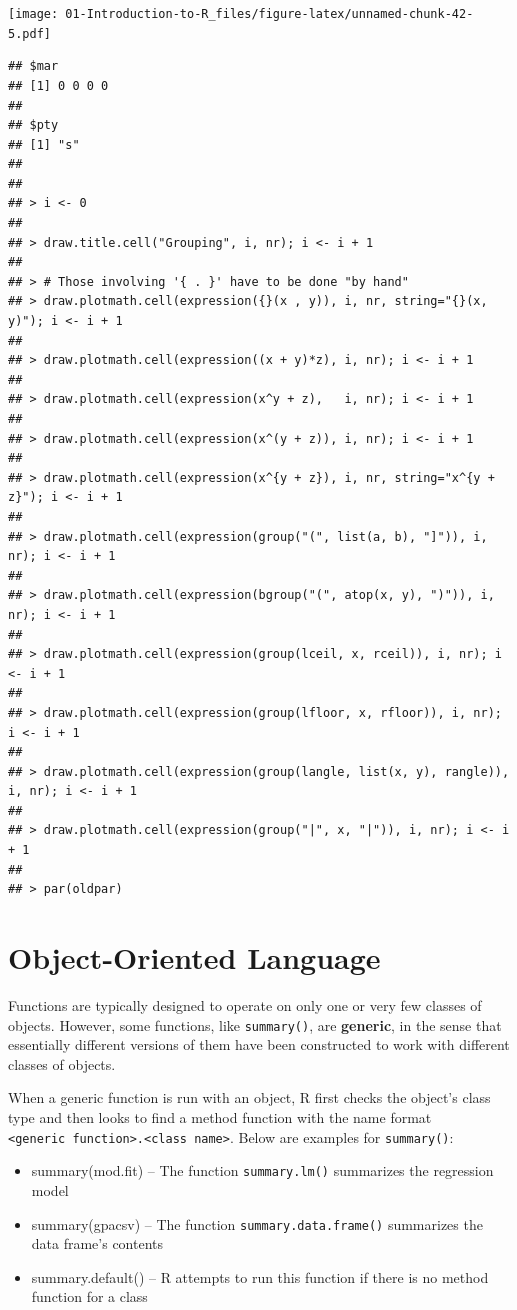 \documentclass[
]{book}
\providecommand{\tightlist}{%
  \setlength{\itemsep}{0pt}\setlength{\parskip}{0pt}}
\theoremstyle{definition}
\theoremstyle{definition}
\theoremstyle{definition}
\theoremstyle{definition}
\theoremstyle{remark}
\begin{document}
\texttt{[image: 01-Introduction-to-R\_files/figure-latex/unnamed-chunk-42-5.pdf]}

\begin{verbatim}
## $mar
## [1] 0 0 0 0
## 
## $pty
## [1] "s"
## 
## 
## > i <- 0
## 
## > draw.title.cell("Grouping", i, nr); i <- i + 1
## 
## > # Those involving '{ . }' have to be done "by hand"
## > draw.plotmath.cell(expression({}(x , y)), i, nr, string="{}(x, y)"); i <- i + 1
## 
## > draw.plotmath.cell(expression((x + y)*z), i, nr); i <- i + 1
## 
## > draw.plotmath.cell(expression(x^y + z),   i, nr); i <- i + 1
## 
## > draw.plotmath.cell(expression(x^(y + z)), i, nr); i <- i + 1
## 
## > draw.plotmath.cell(expression(x^{y + z}), i, nr, string="x^{y + z}"); i <- i + 1
## 
## > draw.plotmath.cell(expression(group("(", list(a, b), "]")), i, nr); i <- i + 1
## 
## > draw.plotmath.cell(expression(bgroup("(", atop(x, y), ")")), i, nr); i <- i + 1
## 
## > draw.plotmath.cell(expression(group(lceil, x, rceil)), i, nr); i <- i + 1
## 
## > draw.plotmath.cell(expression(group(lfloor, x, rfloor)), i, nr); i <- i + 1
## 
## > draw.plotmath.cell(expression(group(langle, list(x, y), rangle)), i, nr); i <- i + 1
## 
## > draw.plotmath.cell(expression(group("|", x, "|")), i, nr); i <- i + 1
## 
## > par(oldpar)
\end{verbatim}

\hypertarget{object-oriented-language}{%
\section{Object-Oriented Language}\label{object-oriented-language}}

Functions are typically designed to operate on only one or very few classes of objects. However, some functions, like \texttt{summary()}, are \textbf{generic}, in the sense that essentially different versions of them have been constructed to work with different classes of objects.

When a generic function is run with an object, R first checks the object's class type and then looks to find a method function with the name format \texttt{\textless{}generic\ function\textgreater{}.\textless{}class\ name\textgreater{}}. Below are examples for \texttt{summary()}:

\begin{itemize}
\tightlist
\item
  summary(mod.fit) -- The function \texttt{summary.lm()} summarizes the regression model
\item
  summary(gpacsv) -- The function \texttt{summary.data.frame()} summarizes the data frame's contents
\item
  summary.default() -- R attempts to run this function if there is no method function for a class
\end{itemize}
\end{document}
